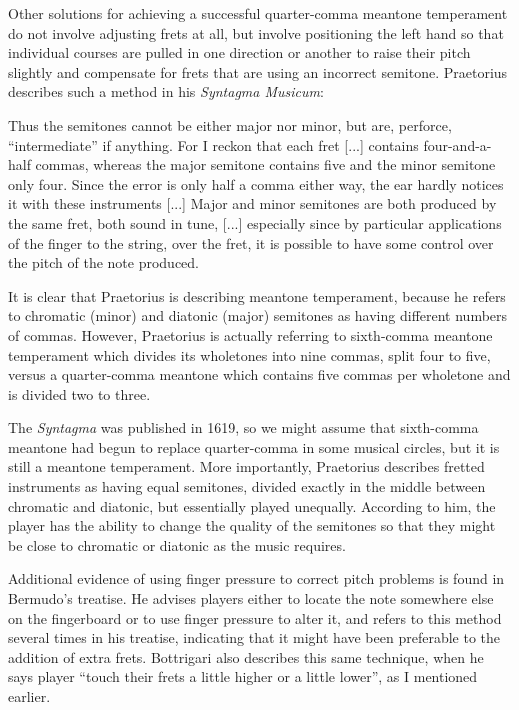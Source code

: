 Other solutions for achieving a successful quarter-comma
meantone
temperament do not involve adjusting frets at all, but involve positioning the left hand
so that individual courses are pulled in one direction or another to raise their pitch
slightly and compensate for frets that are using an incorrect semitone. Praetorius
describes such a method in his \textit{Syntagma Musicum}:
\begin{blocks}
Thus the semitones cannot be either major nor minor, but are, perforce, ``intermediate''
if anything. For I reckon that each fret [...] contains four-and-a-half commas, whereas
the major semitone contains five and the minor semitone only four. Since the error is
only half a comma either way, the ear hardly notices it with these instruments [...]
Major and minor semitones are both produced by the same fret, both sound in tune, [...]
especially since by particular applications of the finger to the string, over the fret,
it is possible to have some control over the pitch of the note produced.
\autocite[68]{MP:1}
\end{blocks}
It is clear that Praetorius is describing meantone temperament, because he
refers to chromatic (minor) and diatonic (major) semitones as having different numbers of
commas.  However, Praetorius is actually referring to sixth-comma meantone temperament
which divides its wholetones into nine commas, split four to five, versus a quarter-comma
meantone which contains five commas per wholetone and is divided two to three.

The \textit{Syntagma} was published in 1619, so we might assume that sixth-comma
meantone had begun to replace quarter-comma in some musical circles, but it is still a
meantone temperament.  More importantly, Praetorius describes fretted instruments as
having equal semitones, divided exactly in the middle between chromatic and diatonic,
but essentially played unequally.  According to him, the player has the ability to
change the quality of the semitones so that they might be close to chromatic or
diatonic as the music requires.

Additional evidence of using finger pressure to correct pitch problems is found
in Bermudo's treatise. He advises players either to locate the note somewhere
else on the fingerboard or to use finger pressure to alter it, and refers to
this method several times in his treatise, indicating that it might have been
preferable to the addition of extra frets. \autocite[106]{DE:1}  Bottrigari also
describes this same technique, when he says player ``touch their frets a little
higher or a little lower'', as I mentioned earlier. \autocite[15]{HB:1}

